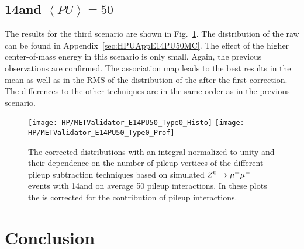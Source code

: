 \subsection{14\TeV and $\left<PU\right> =50$ \label{sec:HPUMETE14PU50}}

The results for the third scenario are shown in Fig.~\ref{plot:HPUMETE14PU50T0}. The distribution of the raw \MET{} can be found in Appendix~\ref{sec:HPUAppE14PU50MC}. The effect of the higher center-of-mass energy in this scenario is only small. Again, the previous observations are confirmed. The association map leads to the best results in the mean as well as in the RMS of the distribution of the \MET{} after the first correction. The differences to the other techniques are in the same order as in the previous scenario. 

\begin{figure}[h!t]
  \centering
  \texttt{[image: HP/METValidator\_E14PU50\_Type0\_Histo]}
  \texttt{[image: HP/METValidator\_E14PU50\_Type0\_Prof]}
  \caption[The corrected \MET{} distribution and their dependence on the number of pileup vertices for different pileup subtraction techniques based on simulated  $\Zz\rightarrow\MM$ events with 14\TeV and PU=50]{The corrected \MET{} distributions with an integral normalized to unity and their dependence on the number of pileup vertices of the different pileup subtraction techniques based on simulated  $\Zz\rightarrow\MM$ events with 14\TeV and on average 50 pileup interactions. In these plots the \MET{} is corrected for the contribution of pileup interactions. \label{plot:HPUMETE14PU50T0}}
\end{figure}

\section{Conclusion}

